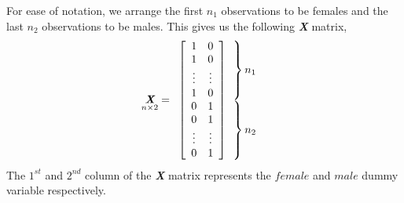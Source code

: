 \documentclass[12pt]{report}
\begin{document}
\noindent For ease of notation, we arrange the first $n_1$ observations to be females and the last $n_2$ observations to be males. This gives us the following \textbf{\textit{X}} matrix,
\begin{equation*}
\underset{n\times2}{\textit{\textbf{X}}} = \begin{array}{c@{\!\!\!}l}
\left[ \begin{array}[c]{ccccc}
1 & 0 \\
1 & 0 \\
\vdots & \vdots \\
1 & 0 \\
0 & 1 \\
0 & 1 \\
\vdots & \vdots \\
0 & 1 \\
\end{array}  \right]
&
\begin{array}[c]{@{}l@{\,}l}
\left. \begin{array}{c} \vphantom{0} \\ \vphantom{0} \\\vphantom{\vdots}\\ \vphantom{0} \end{array} \right\} & \text{$n_1$} \\
\left. \begin{array}{c} \vphantom{1} \\ \vphantom{1} \\ \vphantom{\vdots}
\\ \vphantom{1}  \end{array} \right\} & \text{$n_2$} \\
\end{array}
\end{array}
\end{equation*}
\noindent The $1^{st}$ and $2^{nd}$ column of the \textit{\textbf{X}} matrix represents the $female$ and $male$ dummy variable respectively.
\end{document}
